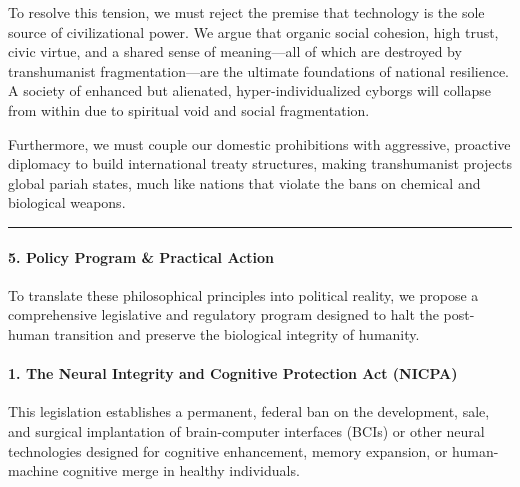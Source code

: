 To resolve this tension, we must reject the premise that technology is
the sole source of civilizational power. We argue that organic social
cohesion, high trust, civic virtue, and a shared sense of meaning---all
of which are destroyed by transhumanist fragmentation---are the ultimate
foundations of national resilience. A society of enhanced but alienated,
hyper-individualized cyborgs will collapse from within due to spiritual
void and social fragmentation.

Furthermore, we must couple our domestic prohibitions with aggressive,
proactive diplomacy to build international treaty structures, making
transhumanist projects global pariah states, much like nations that
violate the bans on chemical and biological weapons.

\begin{center}\rule{0.5\linewidth}{0.5pt}\end{center}

\paragraph{5. Policy Program \& Practical
Action}\label{policy-program-practical-action-33}

To translate these philosophical principles into political reality, we
propose a comprehensive legislative and regulatory program designed to
halt the post-human transition and preserve the biological integrity of
humanity.

\paragraph{1. The Neural Integrity and Cognitive Protection Act
(NICPA)}\label{the-neural-integrity-and-cognitive-protection-act-nicpa}

This legislation establishes a permanent, federal ban on the
development, sale, and surgical implantation of brain-computer
interfaces (BCIs) or other neural technologies designed for cognitive
enhancement, memory expansion, or human-machine cognitive merge in
healthy individuals.

